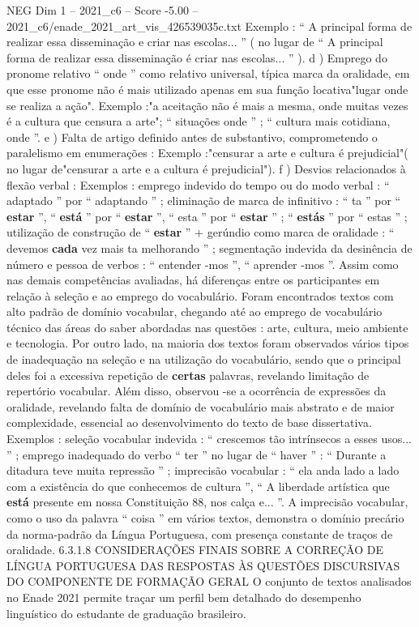 \begin{textsample}{NEG Dim 1 – 2021\_c6 – Score -5.00 – 2021\_c6/enade\_2021\_art\_vis\_426539035c.txt}
Exemplo : “ A principal forma de realizar essa disseminação e criar nas escolas... ” ( no lugar de “ A principal forma de realizar essa disseminação é criar nas escolas... ” ). d ) Emprego do pronome relativo “ onde ” como relativo universal, típica marca da oralidade, em que esse pronome não é mais utilizado apenas em sua função locativa"lugar onde se realiza a ação".
Exemplo :"a aceitação não é mais a mesma, onde muitas vezes é a cultura que censura a arte"; “ situações onde ” ; “ cultura mais cotidiana, onde ”. e ) Falta de artigo definido antes de substantivo, comprometendo o paralelismo em enumerações : Exemplo :"censurar a arte e cultura é prejudicial"( no lugar de"censurar a arte e a cultura é prejudicial"). f ) Desvios relacionados à flexão verbal : Exemplos : emprego indevido do tempo ou do modo verbal : “ adaptado ” por “ adaptando ” ; eliminação de marca de infinitivo : “ ta ” por “ \textbf{estar} ”, “ \textbf{está} ” por “ \textbf{estar} ”, “ esta ” por “ \textbf{estar} ” ; “ \textbf{estás} ” por “ estas ” ; utilização de construção de “ \textbf{estar} ” + gerúndio como marca de oralidade : “ devemos \textbf{cada} vez mais ta melhorando ” ; segmentação indevida da desinência de número e pessoa de verbos : “ entender -mos ”, “ aprender -mos ”.
Assim como nas demais competências avaliadas, há diferenças entre os participantes em relação à seleção e ao emprego do vocabulário.
Foram encontrados textos com alto padrão de domínio vocabular, chegando até ao emprego de vocabulário técnico das áreas do saber abordadas nas questões : arte, cultura, meio ambiente e tecnologia.
Por outro lado, na maioria dos textos foram observados vários tipos de inadequação na seleção e na utilização do vocabulário, sendo que o principal deles foi a excessiva repetição de \textbf{certas} palavras, revelando limitação de repertório vocabular.
Além disso, observou -se a ocorrência de expressões da oralidade, revelando falta de domínio de vocabulário mais abstrato e de maior complexidade, essencial ao desenvolvimento do texto de base dissertativa.
Exemplos : seleção vocabular indevida : “ crescemos tão intrínsecos a esses usos... ” ; emprego inadequado do verbo “ ter ” no lugar de “ haver ” : “ Durante a ditadura teve muita repressão ” ; imprecisão vocabular : “ ela anda lado a lado com a existência do que conhecemos de cultura ”, “ A liberdade artística que \textbf{está} presente em nossa Constituição 88, nos calça e... ”.
A imprecisão vocabular, como o uso da palavra “ coisa ” em vários textos, demonstra o domínio precário da norma-padrão da Língua Portuguesa, com presença constante de traços de oralidade. 6.3.1.8 CONSIDERAÇÕES FINAIS SOBRE A CORREÇÃO DE LÍNGUA PORTUGUESA DAS RESPOSTAS ÀS QUESTÕES DISCURSIVAS DO COMPONENTE DE FORMAÇÃO GERAL O conjunto de textos analisados no Enade 2021 permite traçar um perfil bem detalhado do desempenho linguístico do estudante de graduação brasileiro.

\end{textsample}

